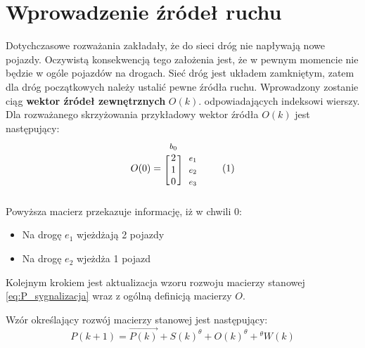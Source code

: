 \documentclass[12pt]{book}
\theoremstyle{plain}
\newcommand\addtag{\refstepcounter{equation}
\renewcommand{\labelenumii}{\theenumii}
\renewcommand{\theenumii}{\theenumi.\arabic{enumii}.}
\tag{\theequation}}
\begin{document}
\section{Wprowadzenie źródeł ruchu}
Dotychczasowe rozważania zakładały, że do sieci dróg nie napływają nowe pojazdy. Oczywistą konsekwencją tego założenia jest, że w pewnym momencie nie będzie w ogóle pojazdów na drogach. Sieć dróg jest układem zamkniętym, zatem dla dróg początkowych należy ustalić pewne źródła ruchu. Wprowadzony zostanie ciąg \textbf{wektor źródeł zewnętrznych} $O(k)$. odpowiadających indeksowi wierszy. Dla rozważanego skrzyżowania przykładowy wektor źródła $O(k)$ jest następujący:
\begin{equation*}
  O(0)=
  \begin{blockarray}{*{1}{c} l}
    \begin{block}{*{1}{>{$\footnotesize}c<{$}} l}
      $b_0$ \\
    \end{block}
    \begin{block}{[*{1}{c}]>{$\footnotesize}l<{$}}
       2 & $e_1$ \\
       1 & $e_2$ \\
       0 & $e_3$ \\
    \end{block}
  \end{blockarray} \addtag \label{skrz_1_zmiennaStanu_0_sygnalizacja}
\end{equation*}
Powyższa macierz przekazuje informację, iż w chwili 0:
\begin{itemize}
\item Na drogę $e_1$ wjeżdżają 2 pojazdy
\item Na drogę $e_2$ wjeżdża 1 pojazd
\end{itemize}
Kolejnym krokiem jest aktualizacja wzoru rozwoju macierzy stanowej \ref{eq:P_sygnalizacja} wraz z ogólną definicją macierzy $O$.
\begin{tcolorbox}
Wzór określający rozwój macierzy stanowej jest następujący:
\[P(k+1)=\overrightarrow{P(k)}+S(k)^\theta+O(k)^\theta + {^\theta W(k)}\]
\end{tcolorbox}
\end{document}
